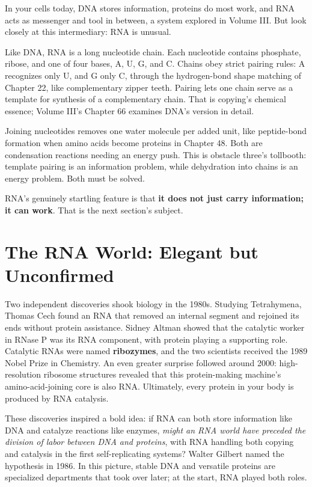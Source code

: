 In your cells today, DNA stores information, proteins do most work, and RNA acts as messenger and tool in between, a system explored in Volume III. But look closely at this intermediary: RNA is unusual.

Like DNA, RNA is a long nucleotide chain. Each nucleotide contains phosphate, ribose, and one of four bases, A, U, G, and C. Chains obey strict pairing rules: A recognizes only U, and G only C, through the hydrogen-bond shape matching of Chapter 22, like complementary zipper teeth. Pairing lets one chain serve as a template for synthesis of a complementary chain. That is copying's chemical essence; Volume III's Chapter 66 examines DNA's version in detail.

Joining nucleotides removes one water molecule per added unit, like peptide-bond formation when amino acids become proteins in Chapter 48. Both are condensation reactions needing an energy push. This is obstacle three's tollbooth: template pairing is an information problem, while dehydration into chains is an energy problem. Both must be solved.

RNA's genuinely startling feature is that \textbf{it does not just carry information; it can work}. That is the next section's subject.

\section{The RNA World: Elegant but Unconfirmed}

Two independent discoveries shook biology in the 1980s. Studying Tetrahymena, Thomas Cech found an RNA that removed an internal segment and rejoined its ends without protein assistance. Sidney Altman showed that the catalytic worker in RNase P was its RNA component, with protein playing a supporting role. Catalytic RNAs were named \textbf{ribozymes}, and the two scientists received the 1989 Nobel Prize in Chemistry. An even greater surprise followed around 2000: high-resolution ribosome structures revealed that this protein-making machine's amino-acid-joining core is also RNA. Ultimately, every protein in your body is produced by RNA catalysis.

These discoveries inspired a bold idea: if RNA can both store information like DNA and catalyze reactions like enzymes, \emph{might an RNA world have preceded the division of labor between DNA and proteins}, with RNA handling both copying and catalysis in the first self-replicating systems? Walter Gilbert named the hypothesis in 1986. In this picture, stable DNA and versatile proteins are specialized departments that took over later; at the start, RNA played both roles.

